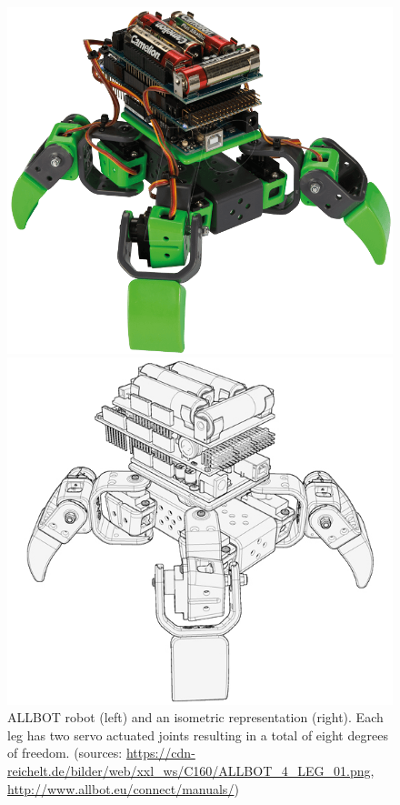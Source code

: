 \begin{figure}[htb]
    \centering
    \begin{minipage}{.4\textwidth}
        \centering
        \includegraphics[width=\linewidth]{ALLBOT_4_LEG_01.png}
    \end{minipage}
    \hspace{.1\textwidth}
    \begin{minipage}{.4\textwidth}
        \centering
        \includegraphics[width=\linewidth]{ALLBOT_isometric_2_bg_crop_flip.jpg}
    \end{minipage}
        \caption{ALLBOT robot (left) and an isometric representation (right).
                 Each leg has two servo actuated joints resulting in a total of eight degrees of freedom.
                 (sources: \url{https://cdn-reichelt.de/bilder/web/xxl_ws/C160/ALLBOT_4_LEG_01.png},
                 \url{http://www.allbot.eu/connect/manuals/})}
        \label{fig:allbot}
\end{figure}


